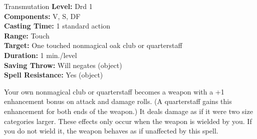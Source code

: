 {Transmutation}
{
	\textbf{Level:}
	Drd 1\\
	\textbf{Components:}
	V, S, DF\\
	\textbf{Casting Time:}
	1 standard action\\
	\textbf{Range:}
	Touch\\
	\textbf{Target:}
	One touched nonmagical oak club or quarterstaff\\
	\textbf{Duration:}
	1 min./level\\
	\textbf{Saving Throw:}
	Will negates (object)\\
	\textbf{Spell Resistance:}
	Yes (object)\\
}
{
	Your own nonmagical club or quarterstaff becomes a weapon with a +1 enhancement bonus on attack and damage rolls. (A quarterstaff gains this enhancement for both ends of the weapon.) It deals damage as if it were two size categories larger. These effects only occur when the weapon is wielded by you. If you do not wield it, the weapon behaves as if unaffected by this spell.

}
